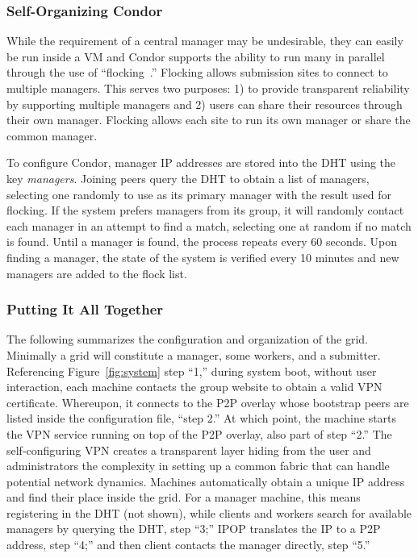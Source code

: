 \subsubsection{Self-Organizing Condor}

While the requirement of a central manager may be undesirable, they can easily
be run inside a VM and Condor supports the ability to run many in parallel
through the use of ``flocking~\cite{flocking}.'' Flocking allows submission
sites to connect to multiple managers.  This serves two purposes: 1) to provide
transparent reliability by supporting multiple managers and 2) users can share
their resources through their own manager.  Flocking allows each site to run
its own manager or share the common manager.  

To configure Condor, manager IP addresses are stored into the DHT using the key
\emph{managers}.  Joining peers query the DHT to obtain a list of managers,
selecting one randomly to use as its primary manager with the result used for
flocking.  If the system prefers managers from its group, it will randomly
contact each manager in an attempt to find a match, selecting one at random if
no match is found.  Until a manager is found, the process repeats every 60
seconds.  Upon finding a manager, the state of the system is verified every 10
minutes and new managers are added to the flock list.

\subsubsection{Putting It All Together}

The following summarizes the configuration and organization of the grid.
Minimally a grid will constitute a manager, some workers, and a submitter.
Referencing Figure~\ref{fig:system} step ``1,'' during system boot, without
user interaction, each machine contacts the group website to obtain a valid VPN
certificate.  Whereupon, it connects to the P2P overlay whose bootstrap peers
are listed inside the configuration file, ``step 2.''  At which point, the
machine starts the VPN service running on top of the P2P overlay, also part of
step ``2.'' The self-configuring VPN creates a transparent layer hiding from
the user and administrators the complexity in setting up a common fabric that
can handle potential network dynamics.  Machines automatically obtain a unique
IP address and find their place inside the grid.  For a manager machine, this
means registering in the DHT (not shown), while clients and workers search for
available managers by querying the DHT, step ``3;'' IPOP translates the IP to a
P2P address, step ``4;'' and then client contacts the manager directly, step
``5.''

